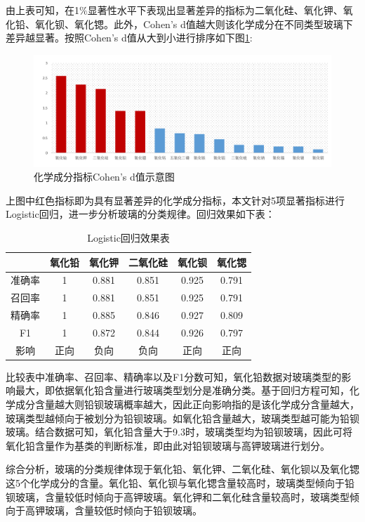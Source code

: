 \documentclass[withoutpreface,bwprint]{cumcmthesis} %
\begin{document}
由上表可知，在1$\%$显著性水平下表现出显著差异的指标为二氧化硅、氧化钾、氧化铅、氧化钡、氧化锶。此外，Cohen's d值越大则该化学成分在不同类型玻璃下差异越显著。按照Cohen's d值从大到小进行排序如下图\ref{xianzhu}:

\begin{figure}[H]
  \centering
  \includegraphics[width=1\textwidth]{figure/显著}
  \caption{化学成分指标Cohen's d值示意图}
  \label{xianzhu}
\end{figure}
上图中红色指标即为具有显著差异的化学成分指标，本文针对5项显著指标进行Logistic回归，进一步分析玻璃的分类规律。回归效果如下表：

\begin{table}[H]
  \centering
  \caption{Logistic回归效果表}
  \begin{tabular}{cccccc}
    \toprule[1.5pt]
    & 氧化铅   & 氧化钾   & 二氧化硅   & 氧化钡  & 氧化锶\\ \hline
    准确率 & 1 & 0.881 & 0.851 & 0.925 & 0.791   \\
    召回率 & 1 & 0.881 & 0.851 & 0.925 & 0.791   \\
    精确率 & 1 & 0.885 & 0.846 & 0.927  & 0.809   \\
    F1  & 1 & 0.872 & 0.844 & 0.926 & 0.797   \\
    影响  & 正向    & 负向    & 负向    & 正向    & 正向  \\ \bottomrule[1.5pt]
  \end{tabular}
\end{table}


比较表中准确率、召回率、精确率以及F1分数可知，氧化铅数据对玻璃类型的影响最大，即依据氧化铅含量进行玻璃类型划分是准确分类。基于回归方程可知，化学成分含量越大则铅钡玻璃概率越大，因此正向影响指的是该化学成分含量越大，玻璃类型越倾向于被划分为铅钡玻璃。如氧化铅含量越大，玻璃类型越可能为铅钡玻璃。结合数据可知，氧化铅含量大于9.3时，玻璃类型均为铅钡玻璃，因此可将氧化铅含量作为基类的判断标准，即由此对铅钡玻璃与高钾玻璃进行划分。

综合分析，玻璃的分类规律体现于氧化铅、氧化钾、二氧化硅、氧化钡以及氧化锶这5个化学成分的含量。氧化铅、氧化钡与氧化锶含量较高时，玻璃类型倾向于铅钡玻璃，含量较低时倾向于高钾玻璃。氧化钾和二氧化硅含量较高时，玻璃类型倾向于高钾玻璃，含量较低时倾向于铅钡玻璃。
\end{document}
